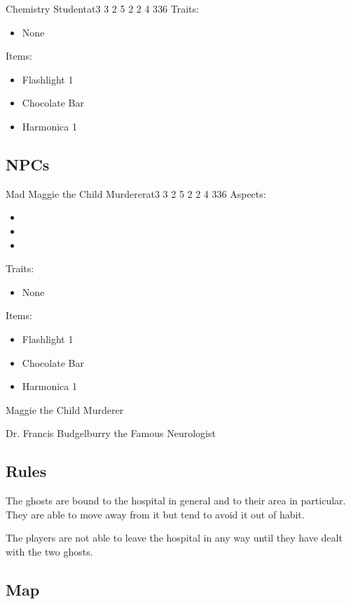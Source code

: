 \documentclass[11pt]{article}
\begin{document}
{\begin{npc}{Chemistry Student}{at}{3 3 2 5 2 2 4 3}{36}
Traits:
\begin{itemize}
\item None
\end{itemize}

Items:
\begin{itemize}
\item Flashlight 1
\item Chocolate Bar
\item Harmonica 1
\end{itemize}
\end{npc}
\subsection{NPCs}
\label{sec:org5f80630}


\begin{npc}{Mad Maggie the Child Murderer}{at}{3 3 2 5 2 2 4 3}{36}
Aspects:
\begin{itemize}
\item {}
\item {}
\item {}
\end{itemize}
\columnbreak

Traits:
\begin{itemize}
\item None
\end{itemize}

Items:
\begin{itemize}
\item Flashlight 1
\item Chocolate Bar
\item Harmonica 1
\end{itemize}
\end{npc}

Maggie the Child Murderer

Dr. Francis Budgelburry the Famous Neurologist
\subsection{Rules}
\label{sec:orgc0be0c7}

The ghosts are bound to the hospital in general and to their area in particular. They are able to move away from it but tend to avoid it out of habit.

The players are not able to leave the hospital in any way until they have dealt with the two ghosts.
\subsection{Map}
\label{sec:org1157a35}

}
\end{document}
